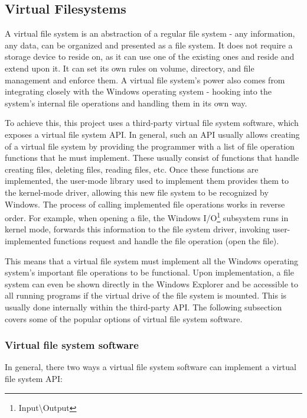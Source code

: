 \subsection{Virtual Filesystems}
\label{vfs}
A virtual file system is an abstraction of a regular file system - any information, any data, can be organized and presented as a file system. It does not require a storage device to reside on, as it can use one of the existing ones and reside and extend upon it. It can set its own rules on volume, directory, and file management and enforce them. A virtual file system's power also comes from integrating closely with the Windows operating system - hooking into the system's internal file operations and handling them in its own way.

To achieve this, this project uses a third-party virtual file system software, which exposes a virtual file system API. In general, such an API usually allows creating of a virtual file system by providing the programmer with a list of file operation functions that he must implement. These usually consist of functions that handle creating files, deleting files, reading files, etc. Once these functions are implemented, the user-mode library used to implement them provides them to the kernel-mode driver, allowing this new file system to be recognized by Windows. The process of calling implemented file operations works in reverse order. For example, when opening a file, the Windows I/O\footnote{Input\textbackslash{}Output} subsystem runs in kernel mode, forwards this information to the file system driver, invoking user-implemented functions request and handle the file operation (open the file).\cite{GitDokany}

This means that a virtual file system must implement all the Windows operating system's important file operations to be functional. Upon implementation, a file system can even be shown directly in the Windows Explorer and be accessible to all running programs if the virtual drive of the file system is mounted. This is usually done internally within the third-party API. The following subsection covers some of the popular options of virtual file system software.

\subsubsection{Virtual file system software}
\label{vfsapitypes}
In general, there two ways a virtual file system software can implement a virtual file system API:

